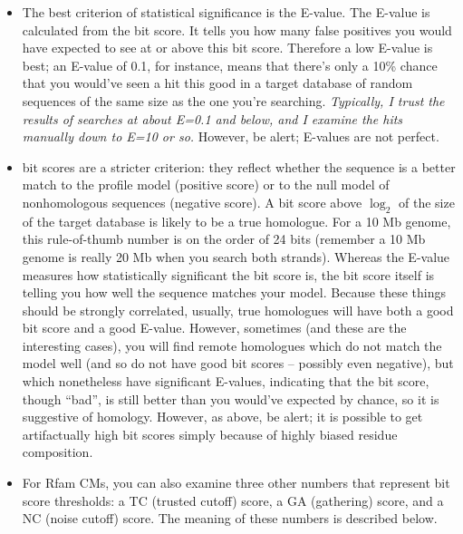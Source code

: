 \begin{itemize}
\item The best criterion of statistical significance is the E-value.
The E-value is calculated from the bit score. It tells you how many
false positives you would have expected to see at or above this bit
score. Therefore a low E-value is best; an E-value of 0.1, for
instance, means that there's only a 10\% chance that you would've seen
a hit this good in a target database of random sequences of the same
size as the one you're searching. {\em
Typically, I trust the results of searches at about E=0.1 and below,
and I examine the hits manually down to E=10 or so.}  However, be
alert;  E-values are not perfect. 

\item {} bit scores are a stricter criterion: they
  reflect whether the sequence is a better match to the profile model
  (positive score) or to the null model of nonhomologous sequences
  (negative score).  A bit score above $\log_2$ of the size of the
  target database is likely to be a true
  homologue. For a 10 Mb genome, this rule-of-thumb number is on
  the order of 24 bits (remember a 10 Mb genome is really 20 Mb when
  you search both strands).  Whereas the E-value measures how
  statistically significant the bit score is, the bit score itself is
  telling you how well the sequence matches your model. Because these
  things should be strongly correlated, usually, true homologues will
  have both a good bit score and a good E-value. However, sometimes
  (and these are the interesting cases), you will find remote
  homologues which do not match the model well (and so do not have
  good bit scores -- possibly even negative), but which nonetheless
  have significant E-values, indicating that the bit score, though
  ``bad'', is still better than you would've expected by chance, so it
  is suggestive of homology. However, as above, be alert; it is
  possible to get artifactually high bit scores simply because of
  highly biased residue composition.
  
\item For Rfam CMs, you can also examine three other numbers that
  represent bit score thresholds: a TC (trusted cutoff) score, a GA
(gathering) score, and a NC (noise cutoff) score. The meaning of
these numbers is described below.
\end{itemize}

